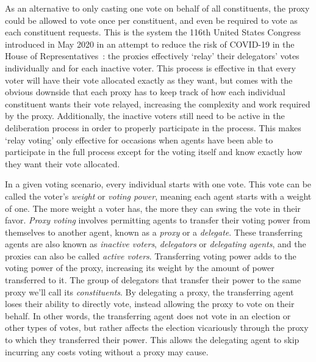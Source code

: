 As an alternative to only casting one vote on behalf of all constituents, the proxy
could be allowed to vote once per constituent, and even be required to vote as each
constituent requests.
This is the system the 116th United States Congress introduced in May 2020 in an
attempt to reduce the risk of COVID-19 in the House of
Representatives~\cite{Congress.gov2020}: the proxies effectively `relay' their
delegators' votes individually and for each inactive voter.
This process is effective in that every voter will have their vote allocated exactly
as they want, but comes with the obvious downside that each proxy has to keep track
of how each individual constituent wants their vote relayed, increasing the
complexity and work required by the proxy.
Additionally, the inactive voters still need to be active in the deliberation process
in order to properly participate in the process.
This makes `relay voting' only effective for occasions when agents have been able to
participate in the full process except for the voting itself and know exactly how
they want their vote allocated.



In a given voting scenario, every individual starts with one vote.
This vote can be called the voter's \textit{weight} or \textit{voting power}, meaning
each agent starts with a weight of one.
The more weight a voter has, the more they can swing the vote in their favor.
\textit{Proxy voting} involves permitting agents to transfer their voting power
from themselves to another agent, known as a \textit{proxy} or a \textit{delegate}.
These transferring agents are also known as \textit{inactive voters},
\textit{delegators} or \textit{delegating agents}, and the proxies can also be called
\textit{active voters}.
Transferring voting power adds to the voting power of the proxy, increasing its
weight by the amount of power transferred to it.
The group of delegators that transfer their power to the same proxy we'll call its
\textit{constituents}.
By delegating a proxy, the transferring agent loses their ability to directly vote,
instead allowing the proxy to vote on their behalf.
In other words, the transferring agent does not vote in an election or other types of
votes, but rather affects the election vicariously through the proxy to which they
transferred their power.
This allows the delegating agent to skip incurring any costs voting without a proxy
may cause.



